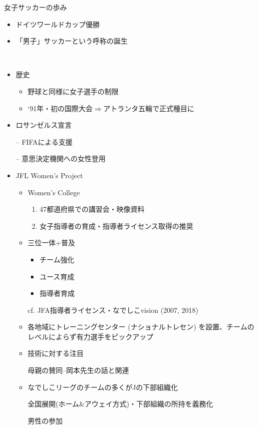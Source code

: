 \documentclass[dvipdfmx, 10.5pt]{jsarticle}
\begin{document}
女子サッカーの歩み

\begin{itemize}
  \item ドイツワールドカップ優勝

  \item 「男子」サッカーという呼称の誕生

　\item 歴史

  \begin{itemize}
    \item 野球と同様に女子選手の制限

    \item `91年・初の国際大会$\Rightarrow$アトランタ五輪で正式種目に
  \end{itemize}

  \item ロサンゼルス宣言

  -- FIFAによる支援

  -- 意思決定機関への女性登用

  \item JFL Women's Project

  \begin{itemize}
    \item Women's College

    \begin{enumerate}
      \item 47都道府県での講習会・映像資料

      \item 女子指導者の育成・指導者ライセンス取得の推奨
    \end{enumerate}

    \item 三位一体+普及

    \begin{itemize}
      \item チーム強化

      \item ユース育成

      \item 指導者育成
    \end{itemize}

    cf. JFA指導者ライセンス・なでしこvision (2007, 2018)

    \item 各地域にトレーニングセンター (ナショナルトレセン) を設置、チームのレベルによらず有力選手をピックアップ

    \item 技術に対する注目

    母親の賛同--岡本先生の話と関連

    \item なでしこリーグのチームの多くがJの下部組織化

    全国展開(ホーム\&アウェイ方式)・下部組織の所持を義務化

    男性の参加

  \end{itemize}


\end{itemize}
\end{document}

